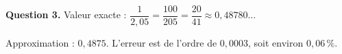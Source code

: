 \textbf{Question 3.}
Valeur exacte : $\dfrac{1}{2{,}05} = \dfrac{100}{205} = \dfrac{20}{41} \approx 0{,}48780\ldots$

Approximation : $0{,}4875$. L'erreur est de l'ordre de $0{,}0003$, soit environ $0{,}06\,\%$.

